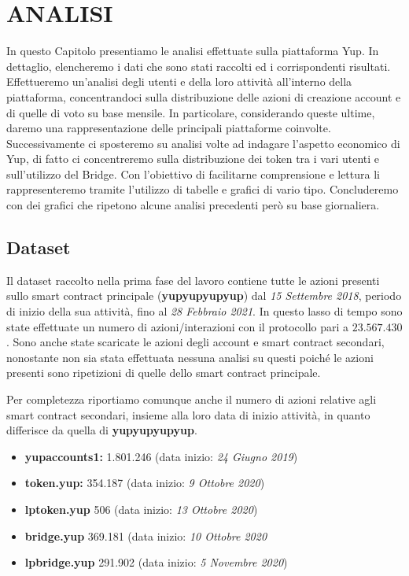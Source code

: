 \chapter{ANALISI}
\label{analisi_marker}
In questo Capitolo presentiamo le analisi effettuate sulla piattaforma Yup. In dettaglio, elencheremo i dati che sono stati raccolti ed i corrispondenti risultati. Effettueremo un'analisi degli utenti e della loro attività all'interno della piattaforma, concentrandoci sulla distribuzione delle azioni di creazione account e di quelle di voto su base mensile. In particolare, considerando queste ultime, daremo una rappresentazione delle principali piattaforme coinvolte.
Successivamente ci sposteremo su analisi volte ad indagare l'aspetto economico di Yup, di fatto ci concentreremo sulla distribuzione dei token tra i vari utenti e sull'utilizzo del Bridge.
Con l'obiettivo di facilitarne comprensione e lettura li rappresenteremo tramite l'utilizzo di tabelle e grafici di vario tipo. Concluderemo con dei grafici che ripetono alcune analisi precedenti però su base giornaliera.

\section{Dataset}
Il dataset raccolto nella prima fase del lavoro contiene tutte le azioni presenti sullo smart contract principale (\textbf{yupyupyupyup}) dal \textit{15 Settembre 2018}, periodo di inizio della sua attività, fino al \textit{28 Febbraio 2021}. In questo lasso di tempo sono state effettuate un numero di azioni/interazioni con il protocollo pari a $23.567.430$. Sono anche state scaricate le azioni degli account e smart contract secondari, nonostante non sia stata effettuata nessuna analisi su questi poiché le azioni presenti sono ripetizioni di quelle dello smart contract principale.


Per completezza riportiamo comunque anche il numero di azioni relative agli smart contract secondari, insieme alla loro data di inizio attività, in quanto differisce da quella di \textbf{yupyupyupyup}.

\begin{itemize}
    \item \textbf{yupaccounts1:} 1.801.246 (data inizio: \textit{24 Giugno 2019})
    \item \textbf{token.yup:} 354.187 (data inizio: \textit{9 Ottobre 2020})
    \item \textbf{lptoken.yup} 506 (data inizio: \textit{13 Ottobre 2020})
    \item \textbf{bridge.yup} 369.181 (data inizio: \textit{10 Ottobre 2020}
    \item \textbf{lpbridge.yup} 291.902 (data inizio: \textit{5 Novembre 2020})
\end{itemize}

